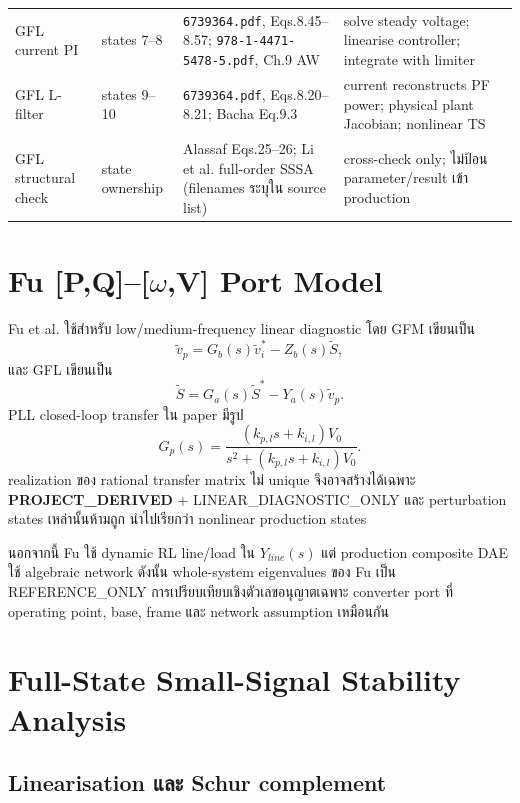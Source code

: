 \documentclass[12pt,a4paper]{article}
\newcommand{\derived}{\textcolor{teal!70!black}{\textbf{PROJECT\_DERIVED}}}
\begin{document}
\begin{longtable}{p{}p{}p{}p{}}
GFL current PI & states 7--8 & \nolinkurl{6739364.pdf}, Eqs.8.45--8.57; \nolinkurl{978-1-4471-5478-5.pdf}, Ch.9 AW & solve steady voltage; linearise controller; integrate with limiter \\
GFL L-filter & states 9--10 & \nolinkurl{6739364.pdf}, Eqs.8.20--8.21; Bacha Eq.9.3 & current reconstructs PF power; physical plant Jacobian; nonlinear TS \\
GFL structural check & state ownership & Alassaf Eqs.25--26; Li et al. full-order SSSA (filenames ระบุใน source list) & cross-check only; ไม่ป้อน parameter/result เข้า production \\
\bottomrule
\end{longtable}

\section{Fu \texorpdfstring{[P,Q]--[$\omega$,V]}{[P,Q]-[omega,V]} Port Model}

Fu et al. ใช้สำหรับ low/medium-frequency linear diagnostic โดย GFM เขียนเป็น
\begin{equation}
\widetilde v_p=G_b(s)\widetilde v_i^*-Z_b(s)\widetilde S,
\end{equation}
และ GFL เขียนเป็น
\begin{equation}
\widetilde S=G_a(s)\widetilde S^*-Y_a(s)\widetilde v_p.
\end{equation}
PLL closed-loop transfer ใน paper มีรูป
\begin{equation}
G_p(s)=\frac{(k_{p,l}s+k_{i,l})V_{0}}
{s^2+(k_{p,l}s+k_{i,l})V_{0}}.
\end{equation}
realization ของ rational transfer matrix ไม่ unique จึงอาจสร้างได้เฉพาะ
\derived{} + LINEAR\_DIAGNOSTIC\_ONLY และ perturbation states เหล่านั้นห้ามถูก
นำไปเรียกว่า nonlinear production states

นอกจากนี้ Fu ใช้ dynamic RL line/load ใน $Y_{line}(s)$ แต่ production composite DAE
ใช้ algebraic network ดังนั้น whole-system eigenvalues ของ Fu เป็น REFERENCE\_ONLY
การเปรียบเทียบเชิงตัวเลขอนุญาตเฉพาะ converter port ที่ operating point, base, frame
และ network assumption เหมือนกัน

\section{Full-State Small-Signal Stability Analysis}

\subsection{Linearisation และ Schur complement}
\end{document}
